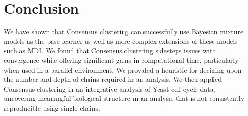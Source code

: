 \documentclass[]{article}
\begin{document}
\section{Conclusion}
We have shown that Consensus clustering can successfully use Bayesian mixture models as the base learner as well as more complex extensions of these models such as MDI. We found that Consensus clustering sidesteps issues with convergence while offering significant gains in computational time, particularly when used in a parallel environment. We provided a heuristic for deciding upon the number and depth of chains required in an analysis. We then applied Consensus clustering in an integrative analysis of Yeast cell cycle data, uncovering meaningful biological structure in an analysis that is not consistently reproducible using single chains.


  
\end{document}

